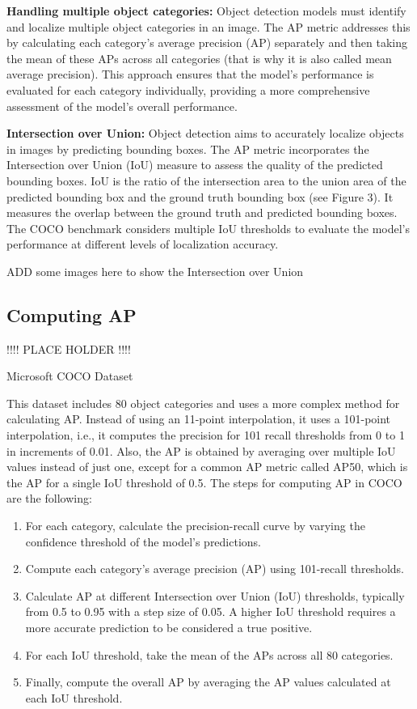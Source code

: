 \documentclass{article}
\begin{document}
\textbf{Handling multiple object categories:} Object detection models must identify and localize multiple object categories in an image. The AP metric addresses this by calculating each category’s average precision (AP) separately and then taking the mean of these APs across all categories (that is why it is also called mean average precision). This approach ensures that the model’s performance is evaluated for each category individually, providing a more comprehensive assessment of the model’s overall performance.

\textbf{Intersection over Union:} Object detection aims to accurately localize objects in images by predicting bounding boxes. The AP metric incorporates the Intersection over Union (IoU) measure to assess the quality of the predicted bounding boxes. IoU is the ratio of the intersection area to the union area of the predicted bounding box and the ground truth bounding box (see Figure 3). It measures the overlap between the ground truth and predicted bounding boxes. The COCO benchmark considers multiple IoU thresholds to evaluate the model’s performance at different levels of localization accuracy.

ADD some images here to show the Intersection over Union


\subsection{Computing AP}

!!!! PLACE HOLDER !!!!

Microsoft COCO Dataset

This dataset includes 80 object categories and uses a more complex method for calculating AP. Instead of using an 11-point interpolation, it uses a 101-point interpolation, i.e., it computes the precision for 101 recall thresholds from 0 to 1 in increments of 0.01. Also, the AP is obtained by averaging over multiple IoU values instead of just one, except for a common AP metric called AP50, which is the AP for a single IoU threshold of 0.5. The steps for computing AP in COCO are the following:

\begin{enumerate}
    \item For each category, calculate the precision-recall curve by varying the confidence threshold of the model’s predictions.
    \item Compute each category’s average precision (AP) using 101-recall thresholds.
    \item Calculate AP at different Intersection over Union (IoU) thresholds, typically from 0.5 to 0.95 with a step size of 0.05. A higher IoU threshold requires a more accurate prediction to be considered a true positive.
    \item For each IoU threshold, take the mean of the APs across all 80 categories.
    \item Finally, compute the overall AP by averaging the AP values calculated at each IoU threshold.
\end{enumerate}
\end{document}

